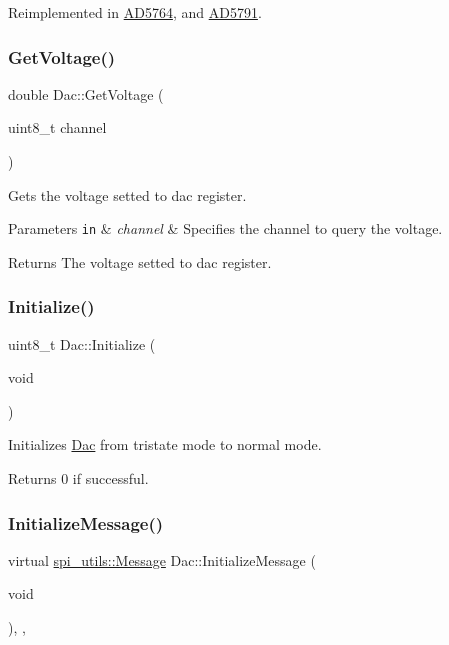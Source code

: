 Reimplemented in \mbox{\hyperlink{classAD5764_a729015992eda059ae615373d1db53823}{A\+D5764}}, and \mbox{\hyperlink{classAD5791_ab1f3eef8afe6989d9981bb29ddec9ec5}{A\+D5791}}.

\mbox{\label{classDac_ad51bf5450f03f39a0357398af69f1705}} 
\subsubsection{\texorpdfstring{Get\+Voltage()}{GetVoltage()}}
{\footnotesize\ttfamily double Dac\+::\+Get\+Voltage (\begin{DoxyParamCaption}\item[{uint8\+\_\+t}]{channel }\end{DoxyParamCaption})}

Gets the voltage setted to dac register. 
\begin{DoxyParams}[1]{Parameters}
\mbox{\tt in}  & {\em channel} & Specifies the channel to query the voltage. \\
\hline
\end{DoxyParams}
\begin{DoxyReturn}{Returns}
The voltage setted to dac register. 
\end{DoxyReturn}
\mbox{\label{classDac_aea1f5f36c9371ebc1527e848ce67e47a}} 
\subsubsection{\texorpdfstring{Initialize()}{Initialize()}}
{\footnotesize\ttfamily uint8\+\_\+t Dac\+::\+Initialize (\begin{DoxyParamCaption}\item[{void}]{ }\end{DoxyParamCaption})}

Initializes \mbox{\hyperlink{classDac}{Dac}} from tristate mode to normal mode. \begin{DoxyReturn}{Returns}
0 if successful. 
\end{DoxyReturn}
\mbox{\label{classDac_a03364933179f8c104a5be6581bde0246}} 
\subsubsection{\texorpdfstring{Initialize\+Message()}{InitializeMessage()}}
{\footnotesize\ttfamily virtual \mbox{\hyperlink{structspi__utils_1_1Message}{spi\+\_\+utils\+::\+Message}} Dac\+::\+Initialize\+Message (\begin{DoxyParamCaption}\item[{void}]{ }\end{DoxyParamCaption})\hspace{0.3cm}{\ttfamily [inline]}, {\ttfamily [protected]}, {\ttfamily [virtual]}}

